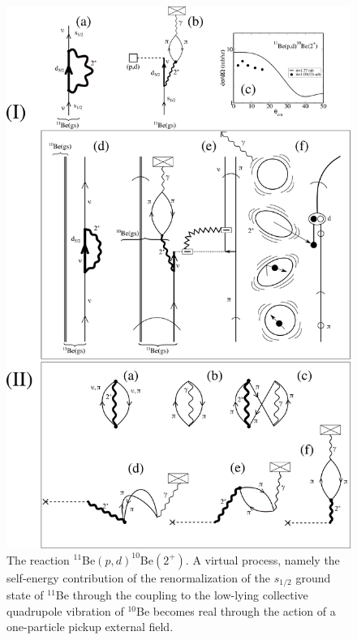 \begin{figure}
	\centerline{\includegraphics*[width=14cm,angle=0]{C8/figsC8/Fig3}}
	\caption{The reaction $^{11}$Be$(p,d)^{10}$Be$(2^+)$. A virtual process, namely the self-energy contribution of the renormalization of the $s_{1/2}$ ground state of $^{11}$Be through the coupling to the low-lying collective quadrupole vibration of  $^{10}$Be becomes real through the action of a one-particle pickup external field.}\label{fig6.6.2}
\end{figure}



